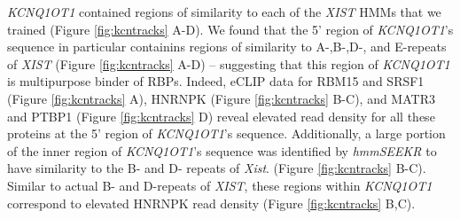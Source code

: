 \emph{KCNQ1OT1} contained regions of similarity to each of the \emph{XIST} HMMs that we trained (Figure \ref{fig:kcntracks} A-D). We found that the 5' region of \emph{KCNQ1OT1}'s sequence in particular containins regions of similarity to A-,B-,D-, and E-repeats of \emph{XIST} (Figure \ref{fig:kcntracks} A-D) -- suggesting that this region of \emph{KCNQ1OT1} is multipurpose binder of RBPs. Indeed, eCLIP data for RBM15 and SRSF1 (Figure \ref{fig:kcntracks} A), HNRNPK (Figure \ref{fig:kcntracks} B-C), and MATR3 and PTBP1 (Figure \ref{fig:kcntracks} D) reveal elevated read density for all these proteins at the 5' region of \emph{KCNQ1OT1}'s sequence. Additionally, a large portion of the inner region of \emph{KCNQ1OT1}'s sequence was identified by \emph{hmmSEEKR} to have similarity to the B- and D- repeats of \emph{Xist}. (Figure \ref{fig:kcntracks} B-C). Similar to actual B- and D-repeats of \emph{XIST}, these regions within \emph{KCNQ1OT1} correspond to elevated HNRNPK read density (Figure \ref{fig:kcntracks} B,C). 
